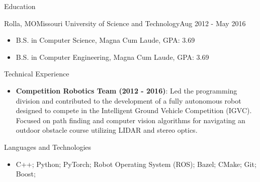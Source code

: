 \documentclass[]{mcdowellcv}
\begin{document}
\begin{cvsection}{Education}
    \begin{cvsubsection}[2]{Rolla, MO}{Missouri University of Science and Technology}{Aug 2012 - May 2016}
        \begin{itemize}
            \item B.S. in Computer Science, Magna Cum Laude, GPA: 3.69
            \item B.S. in Computer Engineering, Magna Cum Laude, GPA: 3.69
        \end{itemize}
    \end{cvsubsection}
\end{cvsection} 

\begin{technical-experience}
    \begin{cvsection}{Technical Experience}
        \begin{cvsubsection}{}{}{}  
            \begin{itemize} 
                \item \textbf{Competition Robotics Team (2012 - 2016)}: Led the programming division and contributed to the development of a fully autonomous robot designed to compete in the Intelligent Ground Vehicle Competition (IGVC). Focused on path finding and computer vision algorithms for navigating an outdoor obstacle course utilizing LIDAR and stereo optics.
            \end{itemize}
        \end{cvsubsection}
    \end{cvsection}
\end{technical-experience}

\begin{cvsection}{Languages and Technologies}
    \begin{cvsubsection}{}{}{}  
        \begin{itemize}
            \item C++; Python; PyTorch; Robot Operating System (ROS); Bazel; CMake; Git; Boost;
        \end{itemize}
    \end{cvsubsection}
\end{cvsection}
\end{document}
